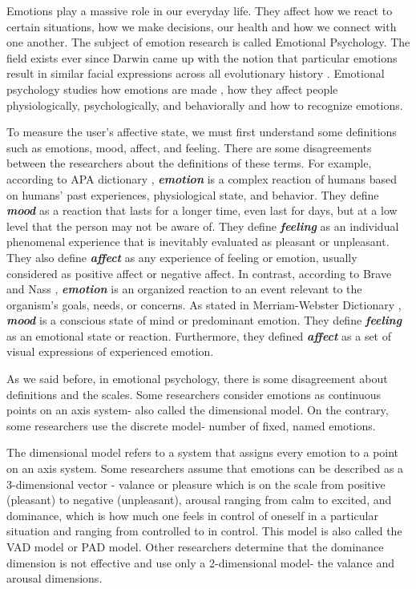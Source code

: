 \documentclass[../main.tex]{subfiles}
\begin{document}
Emotions play a massive role in our everyday life. 
They affect how we react to certain situations, how we make decisions,
our health and how we connect with one another. 
The subject of emotion research is called Emotional Psychology. 
The field exists ever since Darwin came up with the notion that 
particular emotions result in similar facial expressions across all evolutionary history \cite{Darwin_book}. 
Emotional psychology studies how emotions are made \cite{barrett2017emotions}, 
how they affect people physiologically, psychologically, and behaviorally and how to recognize emotions.
\par

To measure the user's affective state, we must first understand some definitions such as
emotions, mood, affect, and feeling.
There are some disagreements between the researchers about the definitions of these terms.
For example, according to APA dictionary \cite{APA_dictionary}, 
\textbf{\emph{emotion}} is a complex reaction of humans based on humans' past experiences,
physiological state, and behavior. 
They define \textbf{\emph{mood}} as a reaction that lasts for a longer time, even last for days,
but at a low level that the person may not be aware of. 
They define \textbf{\emph{feeling}} as an individual phenomenal experience that is 
inevitably evaluated as pleasant or unpleasant. 
They also define \textbf{\emph{affect}} as any experience of feeling or emotion,
usually considered as positive affect or negative affect.
In contrast, according to Brave and Nass \cite{human_computer_interaction}, 
\textbf{\emph{emotion}} is an organized reaction to an event relevant to the organism's goals, needs, or concerns. 
As stated in Merriam-Webster Dictionary \cite{MW-Dictionary}, 
\textbf{\emph{mood}} is a conscious state of mind or predominant emotion. 
They define \textbf{\emph{feeling}} as an emotional state or reaction. 
Furthermore, they defined \textbf{\emph{affect}} as a set of visual expressions of experienced emotion.
\par


As we said before, in emotional psychology, there is some disagreement about definitions and the scales.
Some researchers consider emotions as continuous points on an axis system- also called 
the dimensional model. On the contrary, some researchers use the discrete model-
number of fixed, named emotions.
\par

The dimensional model refers to a system that assigns every emotion to a point on an axis system. 
Some researchers assume that emotions can be described as a 3-dimensional vector \cite{VAD_model}- 
valance or pleasure which is on the scale from positive (pleasant) to negative (unpleasant), 
arousal ranging from calm to excited, and dominance, which is how much one feels in control of oneself in a 
particular situation and ranging from controlled to in control. This model is also called the VAD model or PAD model. 
Other researchers \cite{VA_model} determine that the dominance dimension is not effective and
use only a 2-dimensional model- the valance and arousal dimensions.
\par
\end{document}
